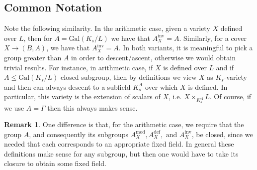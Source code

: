 \documentclass[10pt]{amsart}
\theoremstyle{definition}
\newtheorem{remark}[theorem]{Remark}
\newcommand{\Gal}{{ \mathrm{Gal}}}
\begin{document}
\subsection{Common Notation}


Note the following similarity. In the arithmetic case, given a variety $X$ defined over $L$, then for $A= \Gal(K_s/L)$ we have that $A_X^{\mathrm{inv}} = A$. Similarly, for a cover $X \to (B,A) $, we have that $A_X^{\mathrm{inv}}=A$. In both variants, it is meaningful to pick a group greater than $A$ in order to descent/ascent, otherwise we would obtain trivial results. For instance, in arithmetic case, if $X$ is defined over $L$ and if $A \leq \Gal(K_s/L)$ closed subgroup, then by definitions we view $X$ as $K_s$-variety and then can always descent to a subfield $K_s^A$ over which $X$ is defined. In particular, this variety is the extension of scalars of $X$, i.e. $X \times _{K_s^A} L  $. Of course, if we use $A=\mathfrak{\Gamma}$ then this always makes sense.

\begin{remark}
    One difference is that, for the arithmetic case, we require that the group $A$, and consequently its subgroups $A_X^{\mathrm{mod}}, A_X^{\mathrm{def}}, \text{\ and \ } A_X^{\mathrm{inv}}$, be closed, since we needed that each corresponds to an appropriate fixed field. In general these definitions make sense for any subgroup, but then one would have to take its closure to obtain some fixed field.
    
\end{remark}

\pagebreak
\end{document}
